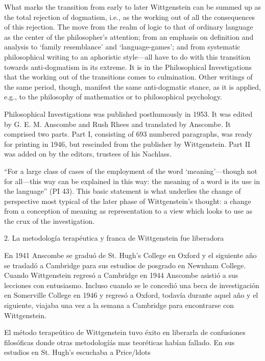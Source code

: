 \begin{revision}
What marks the transition from early to later Wittgenstein can be summed up as
the total rejection of dogmatism, i.e., as the working out of all the
consequences of this rejection. The move from the realm of logic to that of
ordinary language as the center of the philosopher's attention; from an emphasis
on definition and analysis to ‘family resemblance’ and ‘language-games’; and
from systematic philosophical writing to an aphoristic style—all have to do with
this transition towards anti-dogmatism in its extreme. It is in the
Philosophical Investigations that the working out of the transitions comes to
culmination. Other writings of the same period, though, manifest the same
anti-dogmatic stance, as it is applied, e.g., to the philosophy of mathematics
or to philosophical psychology.
\end{revision}


\begin{revision}
Philosophical Investigations was published posthumously in 1953. It was edited
by G. E. M. Anscombe and Rush Rhees and translated by Anscombe. It comprised two
parts. Part I, consisting of 693 numbered paragraphs, was ready for printing in
1946, but rescinded from the publisher by Wittgenstein. Part II was added on by
the editors, trustees of his Nachlass. 
\end{revision}

\begin{revision}
``For a large class of cases of the employment of the word ‘meaning’—though not
for all—this way can be explained in this way: the meaning of a word is its use
in the language'' (PI 43). This basic statement is what underlies the change of
perspective most typical of the later phase of Wittgenstein's thought: a change
from a conception of meaning as representation to a view which looks to use as
the crux of the investigation. 
\end{revision}

2. La metodología terapéutica y franca de Wittgenstein fue liberadora
\begin{revision}


En 1941 Anscombe se graduó de St. Hugh's College en Oxford y el siguiente año se
trasladó a Cambridge para sus estudios de posgrado en Newnham College. Cuando
Wittgenstein regresó a Cambridge en 1944 Anscombe asistió a sus lecciones con
entusiasmo. Incluso cuando se le concedió una beca de investigación en
Somerville College en 1946 y regresó a Oxford, todavía durante aquel año y el
siguiente, viajaba una vez a la semana a Cambridge para encontrarse con
Wittgenstein.  

El método terapeútico de Wittgenstein tuvo éxito en liberarla de confusiones
filosóficas donde otras metodologíás mas teoréticas habían fallado. En sus
estudios en St. Hugh's escuchaba a Price/ldots
\end{revision}

